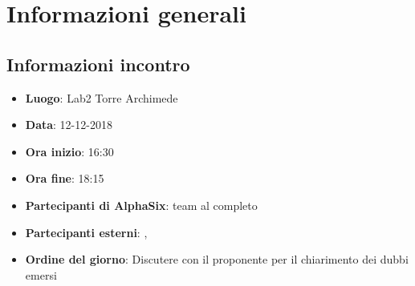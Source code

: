 \newcommand{\documento}{\VE}
\newcommand{\nomedocumentofisico}{VE\_12-12-2018.pdf}
\newcommand{\redazione}{\TG}
\newcommand{\verifica}{\NC}
\newcommand{\approvazione}{\MM}
\newcommand{\versione}{1.0.0}
\newcommand{\uso}{Esterno}
\newcommand{\destinateTo}{\TV, \\ & \RC, \\ & \II}
\newcommand{\datacreazione}{15 dicembre 2018}
\newcommand{\datamodifica}{17 dicembre 2018}
\newcommand{\stato}{Approvato}

\def\TABELLE{false}	%
\def\FIGURE{false} 	%






    

    	
    
    \section{Informazioni generali}
		\subsection{Informazioni incontro}
			\begin{itemize}
				\item { \textbf{Luogo}:  Lab2 Torre Archimede}
				\item { \textbf{Data}: 12-12-2018}
				\item { \textbf{Ora inizio}: 16:30}
				\item { \textbf{Ora fine}: 18:15}
				\item { \textbf{Partecipanti di AlphaSix}: team al completo}
				\item { \textbf{Partecipanti esterni}: {\LuC}, {\DZ}}
				\item { \textbf{Ordine del giorno}: Discutere con il proponente per il chiarimento dei dubbi emersi}
			\end{itemize}

